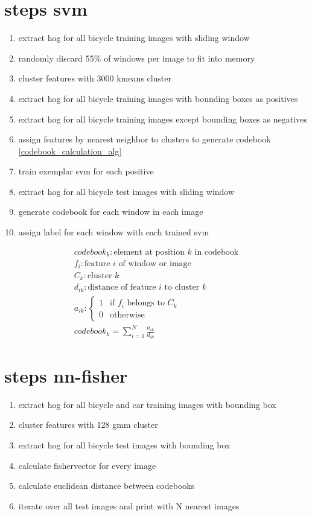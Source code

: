 \section{steps svm}
\begin{enumerate}
	\item extract hog for all bicycle training images with sliding window
	\item randomly discard 55\% of windows per image to fit into memory
	\item cluster features with 3000 kmeans cluster
	\item extract hog for all bicycle training images with bounding boxes as positives
	\item extract hog for all bicycle training images except bounding boxes as negatives
	\item assign features by nearest neighbor to clusters to generate codebook \ref{codebook_calculation_alg}
	\item train exemplar svm for each positive
	\item extract hog for all bicycle test images with sliding window
	\item generate codebook for each window in each image
	\item assign label for each window with each trained svm
\end{enumerate}

\begin{eqnarray}
codebook_k : \text{element at position }k\text{ in codebook} \\
f_i : \text{feature }i\text{ of window or image} \\
C_k : \text{cluster }k \\
d_{ik} : \text{distance of feature }i\text{ to cluster }k \\
a_{ik} : \begin{cases}
1 & \text{if }f_i\text{ belongs to }C_k \\
0 & \text{otherwise}
\end{cases} \\
codebook_k = \sum_{i=1}^N \frac{a_{ik}}{d_{ik}}
\label{codebook_calculation_alg}
\end{eqnarray}

\section{steps nn-fisher}
\begin{enumerate}
	\item extract hog for all bicycle and car training images with bounding box
	\item cluster features with 128 gmm cluster
	\item extract hog for all bicycle test images with bounding box
	\item calculate fishervector for every image
	\item calculate euclidean distance between codebooks
	\item iterate over all test images and print with N nearest images
\end{enumerate}